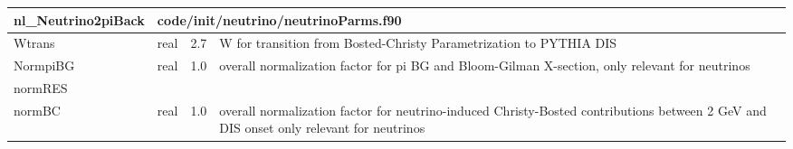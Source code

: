 \documentclass{article}
\begin{document}
\begin{longtable}{llll}
\toprule
\textbf{\large{nl\_Neutrino2piBack}} & \multicolumn{3}{l}{\footnotesize{code/init/neutrino/neutrinoParms.f90}}\\*
\midrule
\endfirsthead
\midrule
\endhead
Wtrans & \begin{minipage}[t]{2cm}real\end{minipage} & \begin{minipage}[t]{2cm}2.7\end{minipage} & \begin{minipage}[t]{12cm}W for transition from Bosted-Christy Parametrization to PYTHIA DIS\end{minipage}\\*
\midrule
NormpiBG & \begin{minipage}[t]{2cm}real\end{minipage} & \begin{minipage}[t]{2cm}1.0\end{minipage} & \begin{minipage}[t]{12cm}overall normalization factor for pi BG and Bloom-Gilman X-section, only relevant for neutrinos\end{minipage}\\*
\midrule
normRES & \begin{minipage}[t]{2cm}\end{minipage} & \begin{minipage}[t]{2cm}\end{minipage} & \begin{minipage}[t]{12cm}\end{minipage}\\*
\midrule
normBC & \begin{minipage}[t]{2cm}real\end{minipage} & \begin{minipage}[t]{2cm}1.0\end{minipage} & \begin{minipage}[t]{12cm}overall normalization factor for neutrino-induced Christy-Bosted contributions between 2 GeV and DIS onset only relevant for neutrinos\end{minipage}\\*
\bottomrule
\end{longtable}
{ }



\end{document}
